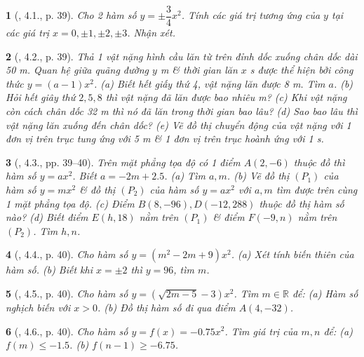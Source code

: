 \documentclass{article}
\newtheorem{baitoan}{}
\begin{document}
\begin{baitoan}[\cite{Binh_boi_duong_Toan_9_tap_2}, 4.1., p. 39]
	Cho 2 hàm số $y = \pm\dfrac{3}{4}x^2$. Tính các giá trị tương ứng của $y$ tại các giá trị $x = 0,\pm1,\pm2,\pm3$. Nhận xét.
\end{baitoan}

\begin{baitoan}[\cite{Binh_boi_duong_Toan_9_tap_2}, 4.2., p. 39]
	Thả 1 vật nặng hình cầu lăn từ trên đỉnh dốc xuống chân dốc dài {\rm50 m}. Quan hệ giữa quãng đường $y$ {\rm m} \& thời gian lăn $x$ {\rm s} được thể hiện bởi công thức $y = (a - 1)x^2$. (a) Biết hết giấy thứ 4, vật nặng lăn được {\rm8 m}. Tìm $a$. (b) Hỏi hết giây thứ $2,5,8$ thì vật nặng đã lăn được bao nhiêu {\rm m}? (c) Khi vật nặng còn cách chân dốc {\rm32 m} thì nó đã lăn trong thời gian bao lâu? (d) Sao bao lâu thì vật nặng lăn xuống đến chân dốc? (e) Vẽ đồ thị chuyển động của vật nặng với 1 đơn vị trên trục tung ứng với {\rm5 m} \& 1 đơn vị trên trục hoành ứng với {\rm1 s}.
\end{baitoan}

\begin{baitoan}[\cite{Binh_boi_duong_Toan_9_tap_2}, 4.3., pp. 39--40]
	Trên mặt phẳng tọa độ có 1 điểm $A(2,-6)$ thuộc đồ thì hàm số $y = ax^2$. Biết $a = -2m + 2.5$. (a) Tìm $a,m$. (b) Vẽ đồ thị $(P_1)$ của hàm số $y = mx^2$ \& đồ thị $(P_2)$ của hàm số $y = ax^2$ với $a,m$ tìm được trên cùng 1 mặt phẳng tọa độ. (c) Điểm $B(8,-96),D(-12,288)$ thuộc đồ thị hàm số nào? (d) Biết điểm $E(h,18)$ nằm trên $(P_1)$ \& điểm $F(-9,n)$ nằm trên $(P_2)$. Tìm $h,n$.
\end{baitoan}

\begin{baitoan}[\cite{Binh_boi_duong_Toan_9_tap_2}, 4.4., p. 40]
	Cho hàm số $y = (m^2 - 2m + 9)x^2$. (a) Xét tính biến thiên của hàm số. (b) Biết khi $x = \pm2$ thì $y = 96$, tìm $m$.
\end{baitoan}

\begin{baitoan}[\cite{Binh_boi_duong_Toan_9_tap_2}, 4.5., p. 40]
	Cho hàm số $y = (\sqrt{2m - 5} - 3)x^2$. Tìm $m\in\mathbb{R}$ để: (a) Hàm số nghịch biến với $x > 0$. (b) Đồ thị hàm số đi qua điểm $A(4,-32)$.
\end{baitoan}

\begin{baitoan}[\cite{Binh_boi_duong_Toan_9_tap_2}, 4.6., p. 40]
	Cho hàm số $y = f(x) = -0.75x^2$. Tìm giá trị của $m,n$ để: (a) $f(m)\le-1.5$. (b) $f(n - 1)\ge-6.75$.
\end{baitoan}
\end{document}
